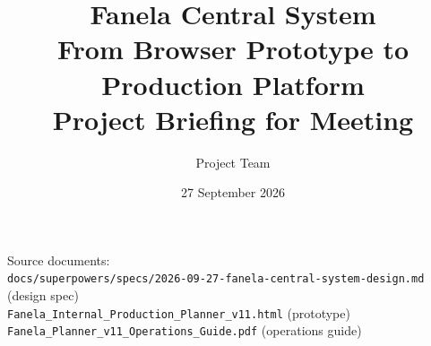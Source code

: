 \documentclass[a4paper,11pt]{article}
\title{\textbf{Fanela Central System}\\[4pt]
  \large From Browser Prototype to Production Platform\\[2pt]
  \normalsize Project Briefing for Meeting}
\author{Project Team}
\date{27 September 2026}
\begin{document}
\maketitle
\vfill
\begin{center}
  \small
  Source documents:\\
  \texttt{docs/superpowers/specs/2026-09-27-fanela-central-system-design.md} (design spec)\\
  \texttt{Fanela\_Internal\_Production\_Planner\_v11.html} (prototype)\\
  \texttt{Fanela\_Planner\_v11\_Operations\_Guide.pdf} (operations guide)
\end{center}
\vspace{1cm}
\newpage

\tableofcontents
\newpage











\end{document}

